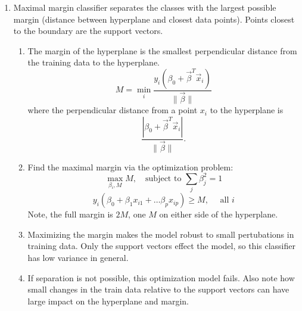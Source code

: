 \documentclass{article}
\begin{document}
\begin{enumerate}
\item Maximal margin classifier separates the classes with the largest possible margin (distance between hyperplane and closest data points). Points closest to the boundary are the support vectors. 
\begin{enumerate}
\item The margin of the hyperplane is the smallest perpendicular distance from the training data to the hyperplane. 
\[
M = \min_i \frac{y_i(\beta_0 + \vec{\beta}^T \vec{x}_i)}{\| \vec{\beta} \|}
\]
where the perpendicular distance from a point $x_i$ to the hyperplane is
\[
\frac{|\beta_0 + \vec{\beta}^T \vec{x}_i|}{\| \vec{\beta} \|}.
\]
\item Find the maximal margin via the optimization problem:
\[
\max_{\beta_i, M} M, \quad \text{subject to } \sum_{j} \beta_j^2 = 1
\]
\[
y_i \left(\beta_0 + \beta_1 x_{i1} + \dots \beta_p x_{ip} \right) \geq M, \quad \text{ all $i$}
\]
Note, the full margin is $2M$, one $M$ on either side of the hyperplane.
\item Maximizing the margin makes the model robust to small pertubations in training data. Only the support vectors effect the model, so this classifier has low variance in general.
\item If separation is not possible, this optimization model fails. Also note how small changes in the train data relative to the support vectors can have large impact on the hyperplane and margin.
\end{enumerate}
\end{enumerate}

\end{document}
